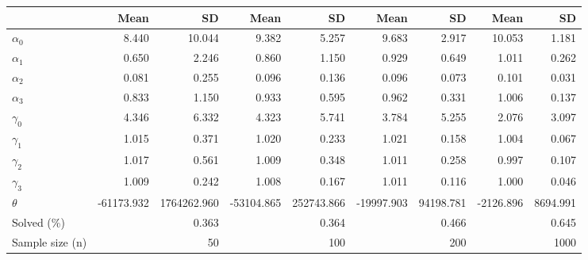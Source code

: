 
\begin{tabular}[t]{lrrrrrrrr}
\toprule
  & Mean & SD & Mean  & SD  & Mean   & SD   & Mean    & SD   \\
\midrule
$\alpha_{0}$ & 8.440 & 10.044 & 9.382 & 5.257 & 9.683 & 2.917 & 10.053 & 1.181\\
$\alpha_{1}$ & 0.650 & 2.246 & 0.860 & 1.150 & 0.929 & 0.649 & 1.011 & 0.262\\
$\alpha_{2}$ & 0.081 & 0.255 & 0.096 & 0.136 & 0.096 & 0.073 & 0.101 & 0.031\\
$\alpha_{3}$ & 0.833 & 1.150 & 0.933 & 0.595 & 0.962 & 0.331 & 1.006 & 0.137\\
$\gamma_{0}$ & 4.346 & 6.332 & 4.323 & 5.741 & 3.784 & 5.255 & 2.076 & 3.097\\
$\gamma_{1}$ & 1.015 & 0.371 & 1.020 & 0.233 & 1.021 & 0.158 & 1.004 & 0.067\\
$\gamma_{2}$ & 1.017 & 0.561 & 1.009 & 0.348 & 1.011 & 0.258 & 0.997 & 0.107\\
$\gamma_{3}$ & 1.009 & 0.242 & 1.008 & 0.167 & 1.011 & 0.116 & 1.000 & 0.046\\
$\theta$ & -61173.932 & 1764262.960 & -53104.865 & 252743.866 & -19997.903 & 94198.781 & -2126.896 & 8694.991\\
Solved (\%) &  & 0.363 &  & 0.364 &  & 0.466 &  & 0.645\\
Sample size (n) &  & 50 &  & 100 &  & 200 &  & 1000\\
\bottomrule
\end{tabular}
